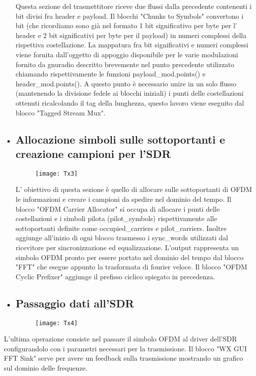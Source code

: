 \begin{itemize}
 Questa sezione del trasmettitore riceve due flussi dalla precedente contenenti i bit divisi fra header e payload. Il blocchi "Chunks to Symbols" convertono i bit (che ricordiamo sono già nel formato 1 bit significativo per byte per l' header e 2 bit significativi per byte per il payload) in numeri complessi della rispettiva costellazione. La mappatura fra bit significativi e numeri complessi viene fornita dall'oggetto di appoggio disponibile per le varie modulazioni fornito da gnuradio descritto brevemente nel punto precedente utilizzato chiamando rispettivamente le funzioni payload\_mod.points() e header\_mod.points(). A questo punto è necessario unire in un solo flusso (mantenendo la divisione fedele ai blocchi iniziali) i punti delle costellazioni ottenuti ricalcolando il tag della lunghezza, questo lavoro viene eseguito dal blocco "Tagged Stream Mux".
 	\item \subsection{Allocazione simboli sulle sottoportanti e creazione campioni per l'SDR}
 	\begin{figure}[h]
 		\centering
 		\texttt{[image: Tx3]}
 		\caption{}
 	\end{figure}
 L' obiettivo di questa sezione è quello di allocare sulle sottoportanti di OFDM le informazioni e creare i campioni da spedire nel dominio del tempo. Il blocco "OFDM Carrier Allocator" si occupa di allocare i punti delle costellazioni e i simboli pilota (pilot\_symbols) rispettivamente alle sottoportanti definite come occupied\_carriers e pilot\_carriers. Inoltre aggiunge all'inizio di ogni blocco trasmesso i sync\_words utilizzati dal ricevitore per sincronizzazione ed equalizzazione. L'output rappresenta un simbolo OFDM pronto per essere portato nel dominio del tempo dal blocco  "FFT" che esegue appunto la trasformata di fourier veloce. Il blocco "OFDM Cyclic Prefixer" aggiunge il prefisso ciclico spiegato in precedenza.
 
 	\item \subsection{Passaggio dati all'SDR}
 	\begin{figure}[h]
 		\centering
 		\texttt{[image: Tx4]}
 		\caption{}
 	\end{figure}
 \end{itemize}
L'ultima operazione consiste nel passare il simbolo OFDM al driver dell'SDR configurandolo con i parametri necessari per la trasmissione. Il blocco "WX GUI FFT Sink" serve per avere un feedback sulla trasmissione mostrando un grafico sul dominio delle frequenze.

